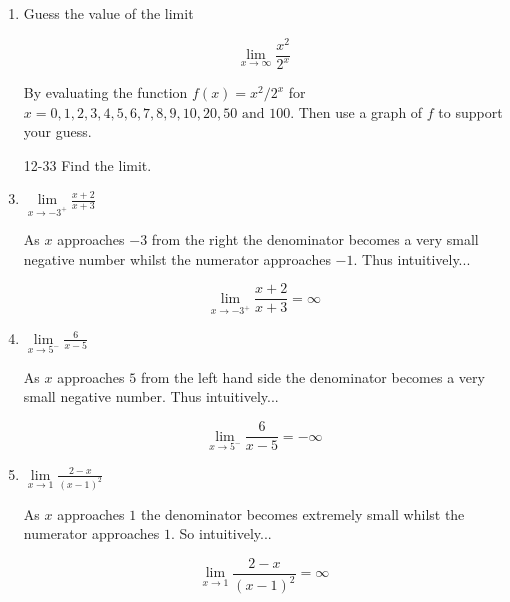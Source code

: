 \documentclass{article}
\begin{document}
\begin{enumerate}
		\item Guess the value of the limit

			$$\lim \limits _{x \to \infty} \frac{x^2}{2^x}$$

		By evaluating the function $f(x) = x^2/2^x$ for $x = 0,1,2,3,4,5,6,7,8,9,10,20,50 \text{ and } 100$.
		Then use a graph of $f$ to support your guess.

		\item[12-33] Find the limit.

		\item $\lim \limits _{x \to -3^{+}} \frac{x+2}{x+3}$

			As $x$ approaches $-3$ from the right the denominator becomes
			a very small negative number whilst the numerator approaches
			$-1$. Thus intuitively...

			$$\lim \limits _{x \to -3^{+}} \frac{x+2}{x+3} = \infty$$

		\item $\lim \limits _{x \to 5^{-}} \frac{6}{x-5}$

			As $x$ approaches $5$ from the left hand side the denominator
			becomes a very small negative number. Thus intuitively...

			$$\lim \limits _{x \to 5^{-}} \frac{6}{x-5} = -\infty$$

		\item $\lim \limits _{x \to 1} \frac{2-x}{(x-1)^2}$

			As $x$ approaches $1$ the denominator becomes extremely
			small whilst the numerator approaches $1$. So intuitively...

			$$\lim \limits _{x \to 1} \frac{2-x}{(x-1)^2} = \infty$$
	\end{enumerate}
\end{document}
